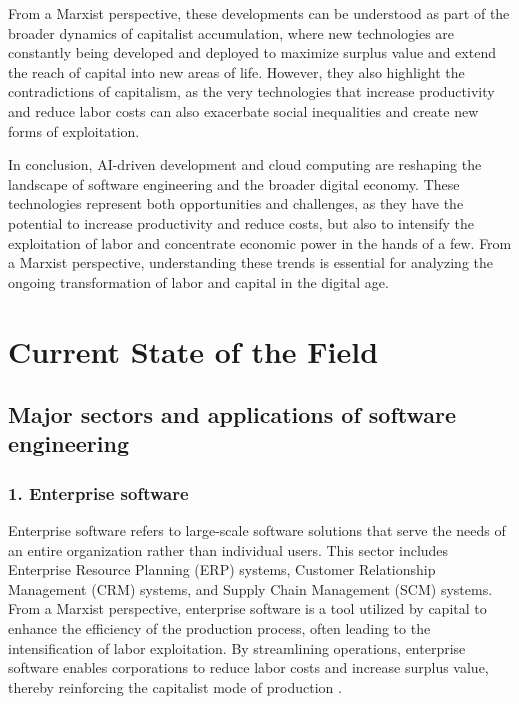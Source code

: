 \begin{refsection}
\begin{multicols}{2}
{From a Marxist perspective, these developments can be understood as part of the broader dynamics of capitalist accumulation, where new technologies are constantly being developed and deployed to maximize surplus value and extend the reach of capital into new areas of life. However, they also highlight the contradictions of capitalism, as the very technologies that increase productivity and reduce labor costs can also exacerbate social inequalities and create new forms of exploitation.

In conclusion, AI-driven development and cloud computing are reshaping the landscape of software engineering and the broader digital economy. These technologies represent both opportunities and challenges, as they have the potential to increase productivity and reduce costs, but also to intensify the exploitation of labor and concentrate economic power in the hands of a few. From a Marxist perspective, understanding these trends is essential for analyzing the ongoing transformation of labor and capital in the digital age.

}
\end{multicols}

\newpage

\section{Current State of the Field}
\begin{multicols}{2}
\subsection{Major sectors and applications of software engineering}
{\small

\subsubsection*{1. Enterprise software}
Enterprise software refers to large-scale software solutions that serve the needs of an entire organization rather than individual users. This sector includes Enterprise Resource Planning (ERP) systems, Customer Relationship Management (CRM) systems, and Supply Chain Management (SCM) systems. From a Marxist perspective, enterprise software is a tool utilized by capital to enhance the efficiency of the production process, often leading to the intensification of labor exploitation. By streamlining operations, enterprise software enables corporations to reduce labor costs and increase surplus value, thereby reinforcing the capitalist mode of production \cite{braverman1974labor}.

}
\end{multicols}
\end{refsection}
